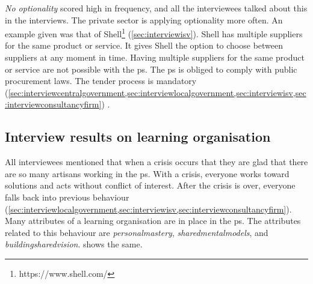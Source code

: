 \textit{No \gls{optionality}} scored high in frequency, and all the interviewees talked about this in the interviews. The private sector is applying optionality more often. An example given was that of Shell\footnote{https://www.shell.com/} (\cref{sec:interviewisv}). Shell has multiple suppliers for the same product or service. It gives Shell the option to choose between suppliers at any moment in time. Having multiple suppliers for the same product or service are not possible with the \gls{ps}. The \gls{ps} is obliged to comply with public procurement laws. The tender process is mandatory (\cref{sec:interviewcentralgovernment,sec:interviewlocalgovernment,sec:interviewisv,sec:interviewconsultancyfirm}) \parencites{Rijksoverheidaanbesteding}{WTO}.
\subsection{Interview results on learning organisation}
\label{sub:interviewresultslearning}
All interviewees mentioned that when a crisis occurs that they are glad that there are so many artisans working in the \gls{ps}. With a crisis, everyone works toward solutions and acts without conflict of interest. After the crisis is over, everyone falls back into previous behaviour (\cref{sec:interviewlocalgovernment,sec:interviewisv,sec:interviewconsultancyfirm}). Many \glspl{attribute} of a learning organisation are in place in the \gls{ps}. The \glspl{attribute} related to this behaviour are \textit{\gls{personalmastery}}, \textit{\glspl{sharedmentalmodel}}, and \textit{\gls{buildingsharedvision}}.  shows the same.

